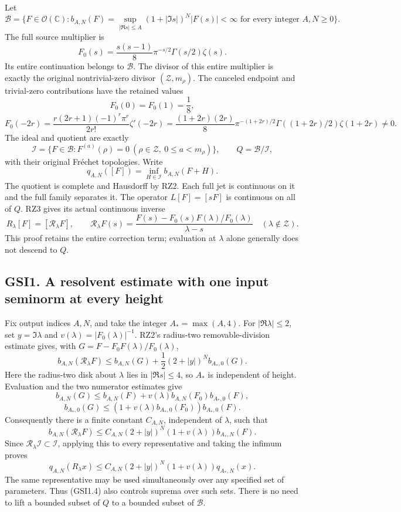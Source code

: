 Let \[
\mathcal B=\{F\in\mathcal O(\mathbb C):
b_{A,N}(F)=\sup_{|\Re s|\le A}(1+|\Im s|)^N|F(s)|<\infty
\text{ for every integer }A,N\ge0\}.
\tag{GSI0.1}
\] The full source multiplier is \[
F_0(s)=\frac{s(s-1)}8\pi^{-s/2}\Gamma(s/2)\zeta(s).
\tag{GSI0.2}
\] Its entire continuation belongs to \(\mathcal B\). The divisor of
this entire multiplier is exactly the original nontrivial-zero divisor
\((\mathscr Z,m_\rho)\). The canceled endpoint and trivial-zero
contributions have the retained values \[
F_0(0)=F_0(1)=\frac18,
\] \[
F_0(-2r)=\frac{r(2r+1)(-1)^r\pi^r}{2r!}\zeta'(-2r)
=\frac{(1+2r)(2r)}8\pi^{-(1+2r)/2}
\Gamma((1+2r)/2)\zeta(1+2r)\ne0.
\tag{GSI0.3}
\] The ideal and quotient are exactly \[
\mathcal I=\{F\in\mathcal B:F^{(a)}(\rho)=0
\ (\rho\in\mathscr Z,\ 0\le a<m_\rho)\},\qquad
Q=\mathcal B/\mathcal I,
\tag{GSI0.4}
\] with their original Fréchet topologies. Write \[
q_{A,N}([F])=\inf_{H\in\mathcal I}b_{A,N}(F+H).
\tag{GSI0.5}
\] The quotient is complete and Hausdorff by RZ2. Each full jet is
continuous on it and the full family separates it. The operator
\(L[F]=[sF]\) is continuous on all of \(Q\). RZ3 gives its actual
continuous inverse \[
R_\lambda[F]=[\mathscr R_\lambda F],\qquad
\mathscr R_\lambda F(s)=
\frac{F(s)-F_0(s)F(\lambda)/F_0(\lambda)}{\lambda-s}
\quad(\lambda\notin\mathscr Z).
\tag{GSI0.6}
\] This proof retains the entire correction term; evaluation at
\(\lambda\) alone generally does not descend to \(Q\).

\subsection{GSI1. A resolvent estimate with one input seminorm at every
height}\label{gsi1.-a-resolvent-estimate-with-one-input-seminorm-at-every-height}

Fix output indices \(A,N\), and take the integer \(A_*=\max(A,4)\). For
\(|\Re\lambda|\le2\), set \(y=\Im\lambda\) and
\(v(\lambda)=|F_0(\lambda)|^{-1}\). RZ2's radius-two removable-division
estimate gives, with \(G=F-F_0F(\lambda)/F_0(\lambda)\), \[
b_{A,N}(\mathscr R_\lambda F)
\le b_{A,N}(G)+\frac12(2+|y|)^N b_{A_*,0}(G).
\tag{GSI1.1}
\] Here the radius-two disk about \(\lambda\) lies in \(|\Re s|\le4\),
so \(A_*\) is independent of height. Evaluation and the two numerator
estimates give \[
b_{A,N}(G)\le b_{A,N}(F)
+v(\lambda)b_{A,N}(F_0)b_{A_*,0}(F),
\] \[
b_{A_*,0}(G)\le
(1+v(\lambda)b_{A_*,0}(F_0))b_{A_*,0}(F).
\tag{GSI1.2}
\] Consequently there is a finite constant \(C_{A,N}\), independent of
\(\lambda\), such that \[
b_{A,N}(\mathscr R_\lambda F)
\le C_{A,N}(2+|y|)^N(1+v(\lambda))b_{A_*,N}(F).
\tag{GSI1.3}
\] Since \(\mathscr R_\lambda\mathcal I\subset\mathcal I\), applying
this to every representative and taking the infimum proves \[
q_{A,N}(R_\lambda x)
\le C_{A,N}(2+|y|)^N(1+v(\lambda))q_{A_*,N}(x).
\tag{GSI1.4}
\] The same representative may be used simultaneously over any specified
set of parameters. Thus (GSI1.4) also controls suprema over such sets.
There is no need to lift a bounded subset of \(Q\) to a bounded subset
of \(\mathcal B\).

